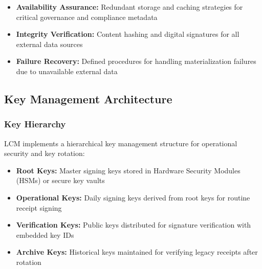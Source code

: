 \documentclass[12pt,a4paper]{article}
\begin{document}
\begin{itemize}
\item \textbf{Availability Assurance:} Redundant storage and caching strategies for critical governance and compliance metadata
\item \textbf{Integrity Verification:} Content hashing and digital signatures for all external data sources
\item \textbf{Failure Recovery:} Defined procedures for handling materialization failures due to unavailable external data
\end{itemize}

\subsection{Key Management Architecture}

\subsubsection{Key Hierarchy}

LCM implements a hierarchical key management structure for operational security and key rotation:

\begin{itemize}
\item \textbf{Root Keys:} Master signing keys stored in Hardware Security Modules (HSMs) or secure key vaults
\item \textbf{Operational Keys:} Daily signing keys derived from root keys for routine receipt signing
\item \textbf{Verification Keys:} Public keys distributed for signature verification with embedded key IDs
\item \textbf{Archive Keys:} Historical keys maintained for verifying legacy receipts after rotation
\end{itemize}
\end{document}
